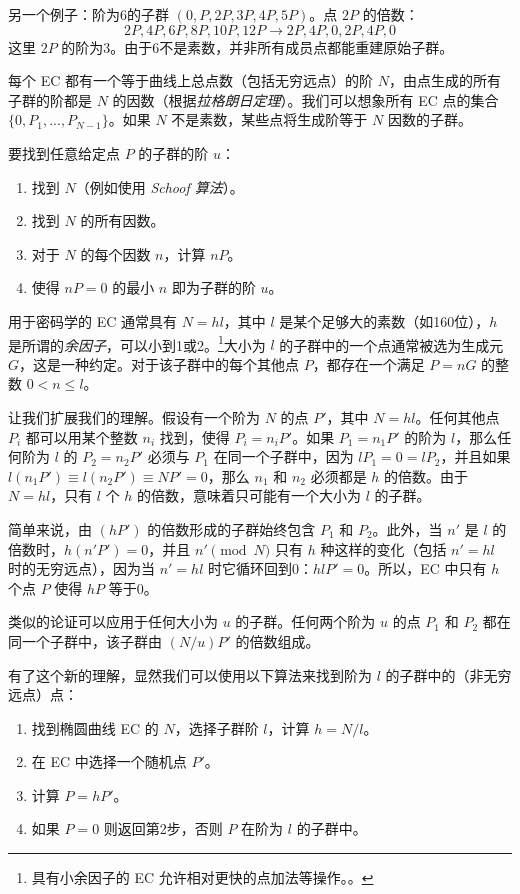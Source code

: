 另一个例子：阶为6的子群 $(0, P, 2P, 3P, 4P, 5P)$。点 $2P$ 的倍数：\vspace{.175cm}
\[2P, 4P, 6P, 8P, 10P, 12P \rightarrow 2P, 4P, 0, 2P, 4P, 0\]
这里 $2P$ 的阶为3。由于6不是素数，并非所有成员点都能重建原始子群。

每个 EC 都有一个等于曲线上总点数（包括无穷远点）的阶 $N$，由点生成的所有子群的阶都是 $N$ 的因数（根据{\em 拉格朗日定理}）。我们可以想象所有 EC 点的集合 $\{0,P_1,...,P_{N-1}\}$。如果 $N$ 不是素数，某些点将生成阶等于 $N$ 因数的子群。

要找到任意给定点 $P$ 的子群的阶 $u$：
\begin{enumerate}
    \item 找到 $N$（例如使用 {\em Schoof 算法}）。
    \item 找到 $N$ 的所有因数。
    \item 对于 $N$ 的每个因数 $n$，计算 $n P$。
    \item 使得 $n P = 0$ 的最小 $n$ 即为子群的阶 $u$。
\end{enumerate} 

用于密码学的 EC 通常具有 $N = hl$，其中 $l$ 是某个足够大的素数（如160位），$h$ 是所谓的{\em 余因子}，可以小到1或2。\footnote{具有小余因子的 EC 允许相对更快的点加法等操作。\cite{Bernstein2008}。}大小为 $l$ 的子群中的一个点通常被选为生成元 $G$，这是一种约定。对于该子群中的每个其他点 $P$，都存在一个满足 $P = n G$ 的整数 $0 < n \leq l$。

让我们扩展我们的理解。假设有一个阶为 $N$ 的点 $P'$，其中 $N=h l$。任何其他点 $P_i$ 都可以用某个整数 $n_i$ 找到，使得 $P_i=n_i P'$。如果 $P_1=n_1 P'$ 的阶为 $l$，那么任何阶为 $l$ 的 $P_2=n_2 P'$ 必须与 $P_1$ 在同一个子群中，因为 $l P_1=0 = l P_2$，并且如果 $l(n_1 P') \equiv l(n_2 P') \equiv N P'=0$，那么 $n_1$ 和 $n_2$ 必须都是 $h$ 的倍数。由于 $N= h l$，只有 $l$ 个 $h$ 的倍数，意味着只可能有一个大小为 $l$ 的子群。

简单来说，由 $(h P')$ 的倍数形成的子群始终包含 $P_1$ 和 $P_2$。此外，当 $n'$ 是 $l$ 的倍数时，$h(n' P')=0$，并且 $n' \pmod N$ 只有 $h$ 种这样的变化（包括 $n' = hl$ 时的无穷远点），因为当 $n' = h l$ 时它循环回到0：$h l P' = 0$。所以，EC 中只有 $h$ 个点 $P$ 使得 $h P$ 等于0。

类似的论证可以应用于任何大小为 $u$ 的子群。任何两个阶为 $u$ 的点 $P_1$ 和 $P_2$ 都在同一个子群中，该子群由 $(N/u) P'$ 的倍数组成。
\par
有了这个新的理解，显然我们可以使用以下算法来找到阶为 $l$ 的子群中的（非无穷远点）点：
\begin{enumerate}
    \item 找到椭圆曲线 EC 的 $N$，选择子群阶 $l$，计算 $h=N/l$。
    \item 在 EC 中选择一个随机点 $P'$。
    \item 计算 $P=h P'$。
    \item 如果 $P=0$ 则返回第2步，否则 $P$ 在阶为 $l$ 的子群中。
\end{enumerate}

